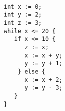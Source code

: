 \begin{lstlisting}[]  % Start your code-block

int x := 0;
int y := 2;
int z := 3;
while x <= 20 {
   if x <= 10 {
      z := x;
      x := x + y;
      y := y + 1;
    } else {
      x := x + 2;
      y := y - 3;
   }
}
	\end{lstlisting}